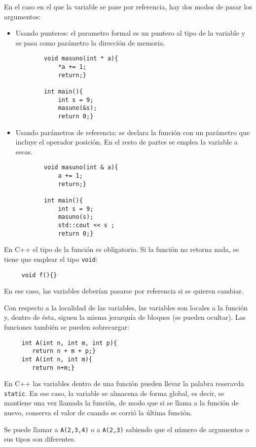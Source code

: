 \documentclass[a4paper]{article}
\begin{document}
 	En el caso en el que la variable se pase por referencia, hay dos modos de pasar los argumentos:
 	\begin{itemize}
 		\item Usando punteros: el parametro formal es un puntero al tipo de la variable y se pasa como parámetro la dirección de memoria.
 		\begin{verbatim}
 		void masuno(int * a){
	 		*a += 1;
	 		return;}
 		
 		int main(){
	 		int s = 9;
	 		masuno(&s);
	 		return 0;}
 		\end{verbatim}
 
 		\item Usando parámetros de referencia: se declara la función con un parámetro que incluye el operador posición. En el resto de partes se emplea la variable a secas.
 		\begin{verbatim}
 		void masuno(int & a){
	 		a += 1;
	 		return;}
 		
 		int main(){
	 		int s = 9;
	 		masuno(s);
	 		std::cout << s ;
	 		return 0;}
 		\end{verbatim}
	 \end{itemize}
	 En C++ el tipo de la función es obligatorio. Si la función no retorna nada, se tiene que emplear el tipo \verb|void|: 
	 
	 \begin{verbatim}
	 void f(){}
	 \end{verbatim}
	 
	 En ese caso, las variables deberían pasarse por referencia si se quieren cambiar.
	 
	 Con respecto a la localidad de las variables, las variables son locales a la función y, dentro de ésta, siguen la misma jerarquía de bloques (se pueden ocultar). Las funciones también se pueden sobrecargar: 
	 
	 \begin{verbatim}
	 int A(int n, int m, int p){
	 	return n + m + p;}
	 int A(int n, int m){
	 	return n+m;}
	 \end{verbatim}
	 
	 En C++ las variables dentro de una función pueden llevar la palabra reseravda \verb|static|. En ese caso, la variable se almacena de forma global, es decir, se mantiene una vez llamada la función, de modo que si se llama a la función de nuevo, conserva el valor de cuando se corrió la última función.
	 
	 Se puede llamar a \verb|A(2,3,4)| o a \verb|A(2,3)| sabiendo que el número de argumentos o sus tipos son diferentes.
	 
\end{document}
